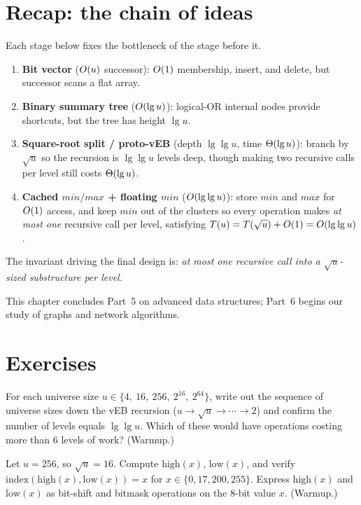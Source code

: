 \section{Recap: the chain of ideas}

Each stage below fixes the bottleneck of the stage before it.

\begin{focusbox}
\begin{enumerate}
  \item \textbf{Bit vector} ($O(u)$ successor): $O(1)$ membership, insert, and delete, but
        successor scans a flat array.
  \item \textbf{Binary summary tree} ($O(\lg u)$): logical-OR internal nodes provide
        shortcuts, but the tree has height $\lg u$.
  \item \textbf{Square-root split / proto-vEB} (depth $\lg\lg u$, time $\Theta(\lg u)$): branch by
        $\sqrt{u}$ so the recursion is $\lg\lg u$ levels deep, though making two recursive calls per level still costs $\Theta(\lg u)$.
  \item \textbf{Cached $\mathit{min}/\mathit{max}$ + floating $\mathit{min}$} ($O(\lg\lg
        u)$): store $\mathit{min}$ and $\mathit{max}$ for $O(1)$ access, and keep $\mathit{min}$ out of the
        clusters so every operation makes \emph{at most one} recursive call per
        level, satisfying $T(u)=T(\sqrt u)+O(1)=O(\lg\lg u)$.
\end{enumerate}
The invariant driving the final design is: \emph{at most one recursive call into a
$\sqrt{u}$-sized substructure per level.}
\end{focusbox}

This chapter concludes Part~5 on advanced data structures; Part~6 begins our study of graphs and network algorithms.

\section{Exercises}

\begin{exercise}
For each universe size $u \in \{4,\ 16,\ 256,\ 2^{16},\ 2^{64}\}$, write out the
sequence of universe sizes down the vEB recursion ($u \to \sqrt u \to \cdots \to
2$) and confirm the number of levels equals $\lg\lg u$. Which of these would have
operations costing more than $6$ levels of work? (Warmup.)
\end{exercise}

\begin{exercise}
Let $u = 256$, so $\sqrt u = 16$. Compute $\mathrm{high}(x)$, $\mathrm{low}(x)$,
and verify $\mathrm{index}(\mathrm{high}(x),\mathrm{low}(x)) = x$ for
$x \in \{0, 17, 200, 255\}$. Express $\mathrm{high}(x)$ and $\mathrm{low}(x)$ as bit-shift and bitmask operations on the $8$-bit value $x$. (Warmup.)
\end{exercise}

